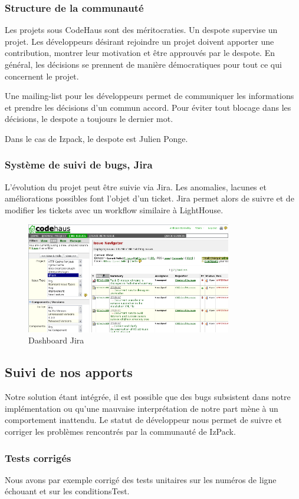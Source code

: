 \subsubsection{Structure de la communauté}
Les projets sous CodeHaus sont des méritocraties. 
Un despote supervise un projet.
Les développeurs désirant rejoindre un projet doivent apporter une contribution, montrer leur motivation et être approuvés par le despote.
En général, les décisions se prennent de manière démocratiques pour tout ce qui concernent le projet.

Une mailing-list pour les développeurs permet de communiquer les informations et prendre les décisions d'un commun accord.
Pour éviter tout blocage dans les décisions, le despote a toujours le dernier mot.

Dans le cas de Izpack, le despote est Julien Ponge.
\subsubsection{Système de suivi de bugs, Jira}
L'évolution du projet peut être suivie via Jira.
Les anomalies, lacunes et améliorations possibles font l'objet d'un ticket.
Jira permet alors de suivre et de modifier les tickets avec un workflow similaire à LightHouse.
\begin{figure}[H]
	\centering
	\includegraphics[width=0.8\textwidth]{../image/jira.png}
	\caption{Dashboard Jira}
\end{figure}
\subsection{Suivi de nos apports}
Notre solution étant intégrée, il est possible que des bugs subsistent dans notre implémentation ou qu'une mauvaise interprétation de notre part mène à un comportement inattendu.
Le statut de développeur nous permet de suivre et corriger les problèmes rencontrés par la communauté de IzPack.
\subsubsection{Tests corrigés}
Nous avons par exemple corrigé des tests unitaires sur les numéros de ligne échouant et sur les conditionsTest.
